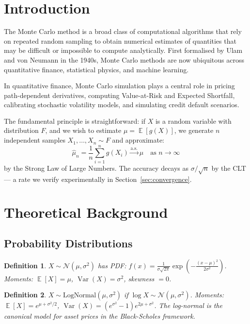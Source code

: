 \documentclass[12pt,a4paper]{article}
\newtheorem{definition}{Definition}
\DeclareMathOperator{\E}{\mathbb{E}}
\DeclareMathOperator{\Var}{Var}
\begin{document}
\tableofcontents\newpage

\section{Introduction}

The Monte Carlo method is a broad class of computational algorithms that rely on repeated random
sampling to obtain numerical estimates of quantities that may be difficult or impossible to compute
analytically. First formalised by Ulam and von Neumann in the 1940s, Monte Carlo methods are
now ubiquitous across quantitative finance, statistical physics, and machine learning.

In quantitative finance, Monte Carlo simulation plays a central role in pricing path-dependent
derivatives, computing Value-at-Risk and Expected Shortfall, calibrating stochastic volatility
models, and simulating credit default scenarios.

The fundamental principle is straightforward: if $X$ is a random variable with distribution $F$,
and we wish to estimate $\mu = \E[g(X)]$, we generate $n$ independent samples $X_1,\ldots,X_n\sim F$
and approximate:
\begin{equation}
  \hat{\mu}_n = \frac{1}{n}\sum_{i=1}^{n}g(X_i) \xrightarrow{\text{a.s.}} \mu
  \quad\text{as }n\to\infty \label{eq:mc}
\end{equation}
by the Strong Law of Large Numbers. The accuracy decays as $\sigma/\sqrt{n}$ by the CLT ---
a rate we verify experimentally in Section~\ref{sec:convergence}.

\section{Theoretical Background}

\subsection{Probability Distributions}

\begin{definition}
$X\sim\mathcal{N}(\mu,\sigma^2)$ has PDF:
$f(x)=\frac{1}{\sigma\sqrt{2\pi}}\exp\!\left(-\frac{(x-\mu)^2}{2\sigma^2}\right)$.
Moments: $\E[X]=\mu$, $\Var(X)=\sigma^2$, skewness $=0$.
\end{definition}

\begin{definition}
$X\sim\text{LogNormal}(\mu,\sigma^2)$ if $\log X\sim\mathcal{N}(\mu,\sigma^2)$.
Moments: $\E[X]=e^{\mu+\sigma^2/2}$, $\Var(X)=(e^{\sigma^2}-1)e^{2\mu+\sigma^2}$.
The log-normal is the canonical model for asset prices in the Black-Scholes framework.
\end{definition}
\end{document}
